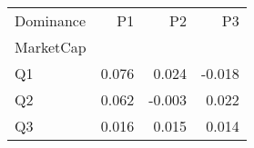 \begin{tabular}{lrrr}
\toprule
Dominance & P1 & P2 & P3 \\
MarketCap &  &  &  \\
\midrule
Q1 & 0.076 & 0.024 & -0.018 \\
Q2 & 0.062 & -0.003 & 0.022 \\
Q3 & 0.016 & 0.015 & 0.014 \\
\bottomrule
\end{tabular}
